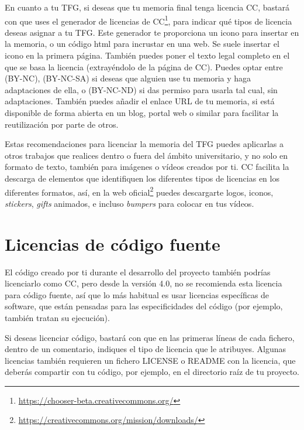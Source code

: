  
En cuanto a tu TFG, si deseas que tu memoria final tenga licencia CC, bastará con que uses el generador de licencias de CC\footnote{\url{https://chooser-beta.creativecommons.org/}}, para indicar qué tipos de licencia deseas asignar a tu TFG. Este generador te proporciona un icono para insertar en la memoria, o un código html para incrustar en una web. Se suele insertar el icono en la primera página. También puedes poner el texto legal completo en el que se basa la licencia (extrayéndolo de la página de CC). Puedes optar entre (BY-NC), (BY-NC-SA) si deseas que alguien use tu memoria y haga adaptaciones de ella, o (BY-NC-ND) si das permiso para usarla tal cual, sin adaptaciones. También puedes añadir el enlace URL de tu memoria, si está disponible de forma abierta en un blog, portal web o similar para facilitar la reutilización por parte de otros. 


Estas recomendaciones para licenciar la memoria del TFG puedes aplicarlas a otros trabajos que realices dentro o fuera del ámbito universitario, y no solo en formato de texto, también para imágenes o vídeos creados por ti. CC facilita la descarga de elementos que identifiquen los diferentes tipos de licencias en los diferentes formatos, así, en la web oficial\footnote{\url{https://creativecommons.org/mission/downloads/}} puedes descargarte logos, iconos, \textit{stickers}, \textit{gifts} animados, e incluso \textit{bumpers} para colocar en tus vídeos.

\section{Licencias de código fuente}

El código creado por ti durante el desarrollo del proyecto también podrías licenciarlo como CC, pero desde la versión 4.0, no se recomienda esta licencia para código fuente, así que lo más habitual es usar licencias específicas de software, que están pensadas para las especificidades del código (por ejemplo, también tratan su  ejecución). 

Si deseas licenciar código, bastará con que en las primeras líneas de cada fichero, dentro de un comentario, indiques el tipo de licencia que le atribuyes. Algunas licencias también requieren un fichero LICENSE o README con la licencia, que deberás compartir con tu código, por ejemplo, en el directorio raíz de tu proyecto.

